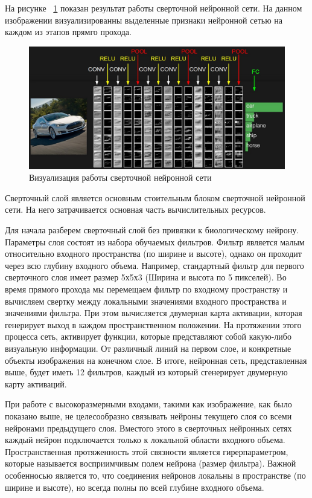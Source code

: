 \documentclass[a4paper,english,russian]{G2-105}
\begin{document}
\par На рисунке ~\ref{convnet} показан результат работы сверточной нейронной сети. На данном изображении визуализированны выделенные признаки нейронной сетью на каждом из этапов прямго прохода.
\begin{figure}
    \includegraphics[width=\linewidth]{convnet.png}
    \caption{Визуализация работы сверточной нейронной сети}
	\label{convnet}
\end{figure}
\par Сверточный слой является основным стоительным блоком сверточной нейронной сети. На него затрачивается основная часть вычислительных ресурсов.
\par Для начала разберем сверточный слой без привязки к биологическому нейрону. Параметры слоя состоят из набора обучаемых фильтров. Фильтр является малым относительно входного пространства (по ширине и высоте), однако он проходит через всю глубину входного объема. Например, стандартный фильтр для первого сверточного слоя имеет размер 5х5х3 (Ширина и высота по 5 пикселей). Во время прямого прохода мы перемещаем фильтр по входному пространству и вычисляем свертку между локальными значениями входного пространства и значениями фильтра. При этом вычисляется двумерная карта активации, которая генерирует выход в каждом пространственном положении. На протяжении этого процесса сеть, активирует функции, которые представляют собой какую-либо визуальную информации. От различный линий на первом слое, и конкретные объекты изображения на конечном слое. В итоге, нейронная сеть, представленная выше, будет иметь 12 фильтров, каждый из который сгенерирует двумерную карту активаций.
\par При работе с высокоразмерными входами, такими как изображение, как было показано выше, не целесообразно связывать нейроны текущего слоя со всеми нейронами предыдущего слоя. Вместого этого в сверточных нейронных сетях каждый нейрон подключается только к локальной области входного объема. Пространственная протяженность этой связности является гирерпараметром, которые называется восприимчивым полем нейрона (размер фильтра). Важной особенносью является то, что соединения нейронов локальны в пространстве (по ширине и высоте), но всегда полны по всей глубине входного объема.
\end{document}
